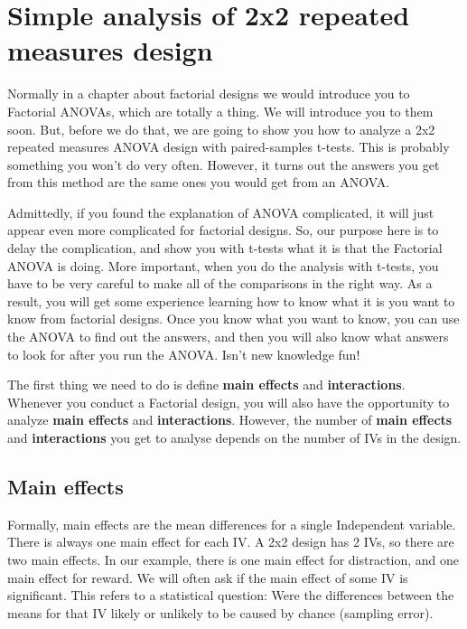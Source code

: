 \documentclass[
]{book}
\begin{document}
\section{Simple analysis of 2x2 repeated measures design}\label{simple-analysis-of-2x2-repeated-measures-design}

Normally in a chapter about factorial designs we would introduce you to Factorial ANOVAs, which are totally a thing. We will introduce you to them soon. But, before we do that, we are going to show you how to analyze a 2x2 repeated measures ANOVA design with paired-samples t-tests. This is probably something you won't do very often. However, it turns out the answers you get from this method are the same ones you would get from an ANOVA.

Admittedly, if you found the explanation of ANOVA complicated, it will just appear even more complicated for factorial designs. So, our purpose here is to delay the complication, and show you with t-tests what it is that the Factorial ANOVA is doing. More important, when you do the analysis with t-tests, you have to be very careful to make all of the comparisons in the right way. As a result, you will get some experience learning how to know what it is you want to know from factorial designs. Once you know what you want to know, you can use the ANOVA to find out the answers, and then you will also know what answers to look for after you run the ANOVA. Isn't new knowledge fun!

The first thing we need to do is define \textbf{main effects} and \textbf{interactions}. Whenever you conduct a Factorial design, you will also have the opportunity to analyze \textbf{main effects} and \textbf{interactions}. However, the number of \textbf{main effects} and \textbf{interactions} you get to analyse depends on the number of IVs in the design.

\subsection{Main effects}\label{main-effects}

Formally, main effects are the mean differences for a single Independent variable. There is always one main effect for each IV. A 2x2 design has 2 IVs, so there are two main effects. In our example, there is one main effect for distraction, and one main effect for reward. We will often ask if the main effect of some IV is significant. This refers to a statistical question: Were the differences between the means for that IV likely or unlikely to be caused by chance (sampling error).
\end{document}

